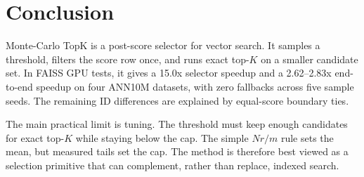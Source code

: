 \section{Conclusion}

Monte-Carlo TopK is a post-score selector for vector search. It samples a
threshold, filters the score row once, and runs exact top-$K$ on a smaller
candidate set. In FAISS GPU tests, it gives a 15.0x selector speedup and a
2.62--2.83x end-to-end speedup on four ANN10M datasets, with zero fallbacks
across five sample seeds. The remaining ID differences are explained by
equal-score boundary ties.

The main practical limit is tuning. The threshold must keep enough candidates
for exact top-$K$ while staying below the cap. The simple $N r/m$ rule sets the
mean, but measured tails set the cap. The method is therefore best viewed as a
selection primitive that can complement, rather than replace, indexed search.
